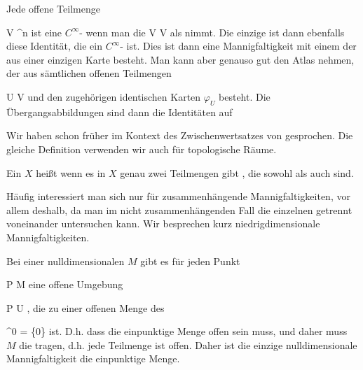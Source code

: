 {

Jede offene Teilmenge

\mavergleichskette
{\vergleichskette
{ V
}
{ \subseteq }{ \R^n
}
{  }{
}
{    }{
}
{   }{
}
}
{}{}{}
ist eine
$C^\infty$-
wenn man die
 { V } { V
} {}
als
nimmt. Die einzige
ist dann ebenfalls diese Identität, die ein $C^\infty$-
ist. Dies ist dann eine Mannigfaltigkeit mit einem
der aus einer einzigen Karte besteht. Man kann aber genauso gut den Atlas nehmen, der aus sämtlichen offenen Teilmengen

\mavergleichskette
{\vergleichskette
{ U
}
{ \subseteq }{ V
}
{  }{
}
{    }{
}
{   }{
}
}
{}{}{}
und den zugehörigen identischen Karten $\varphi_U$ besteht. Die Übergangsabbildungen sind dann die Identitäten auf

}

Wir haben schon früher im Kontext des Zwischenwertsatzes von
gesprochen. Die gleiche Definition verwenden wir auch für topologische Räume.

{}
{

Ein
$X$ heißt  wenn es in $X$ genau zwei Teilmengen gibt
 {} {,}
die sowohl
als auch
sind.

}

Häufig interessiert man sich nur für zusammenhängende Mannigfaltigkeiten, vor allem deshalb, da man im nicht zusammenhängenden Fall die einzelnen  getrennt voneinander untersuchen kann. Wir besprechen kurz niedrigdimensionale Mannigfaltigkeiten.

{

Bei einer nulldimensionalen
$M$ gibt es für jeden Punkt

\mavergleichskette
{\vergleichskette
{ P
}
{ \in }{ M
}
{  }{
}
{    }{
}
{   }{
}
}
{}{}{}
eine offene Umgebung

\mavergleichskette
{\vergleichskette
{ P
}
{ \in }{ U
}
{  }{
}
{    }{
}
{   }{
}
}
{}{}{,}
die
zu einer offenen Menge des

\mavergleichskette
{\vergleichskette
{ \R^0
}
{ = }{ \{0\}
}
{  }{
}
{    }{
}
{   }{
}
}
{}{}{}
ist. D.h. dass die einpunktige Menge
 offen sein muss, und daher muss $M$ die
tragen, d.h. jede Teilmenge ist offen. Daher ist die einzige
nulldimensionale Mannigfaltigkeit die einpunktige Menge.

}

